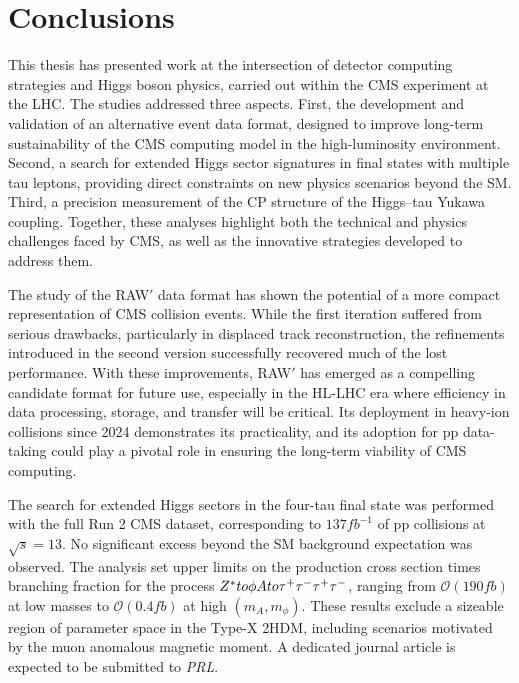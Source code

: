 \chapter{Conclusions}
\thispagestyle{plain}  %
\pagestyle{chapterpages}
\label{Section:Conclusions}

This thesis has presented work at the intersection of detector computing strategies and Higgs boson physics, carried out within the \ac{CMS} experiment at the \ac{LHC}. The studies addressed three aspects. First, the development and validation of an alternative event data format, designed to improve long-term sustainability of the CMS computing model in the high-luminosity environment. Second, a search for extended Higgs sector signatures in final states with multiple tau leptons, providing direct constraints on new physics scenarios beyond the \ac{SM}. Third, a precision measurement of the CP structure of the Higgs–tau Yukawa coupling. Together, these analyses highlight both the technical and physics challenges faced by CMS, as well as the innovative strategies developed to address them.

The study of the RAW$'$ data format has shown the potential of a more compact representation of \ac{CMS} collision events. While the first iteration suffered from serious drawbacks, particularly in displaced track reconstruction, the refinements introduced in the second version successfully recovered much of the lost performance. With these improvements, RAW$'$ has emerged as a compelling candidate format for future use, especially in the \ac{HL}-\ac{LHC} era where efficiency in data processing, storage, and transfer will be critical. Its deployment in heavy-ion collisions since 2024 demonstrates its practicality, and its adoption for pp data-taking could play a pivotal role in ensuring the long-term viability of CMS computing.

The search for extended Higgs sectors in the four-tau final state was performed with the full Run 2 CMS dataset, corresponding to $137\unit{fb}^{-1}$ of pp collisions at $\sqrt{s} = 13$\TeV. No significant excess beyond the \ac{SM} background expectation was observed. The analysis set upper limits on the production cross section times branching fraction for the process $Z^* to \phi A to \tau^+\tau^-\tau^+\tau^-$, ranging from $\mathcal{O}(190\unit{fb})$ at low masses to $\mathcal{O}(0.4\unit{fb})$ at high $(m_A, m_\phi)$. These results exclude a sizeable region of parameter space in the Type-X \ac{2HDM}, including scenarios motivated by the muon anomalous magnetic moment. A dedicated journal article is expected to be submitted to \textit{PRL}.

